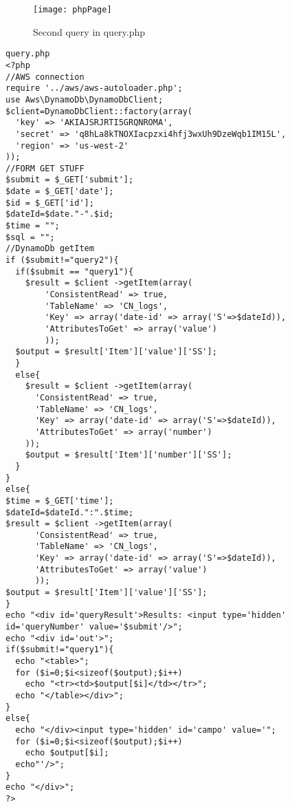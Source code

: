 \documentclass{article}
\begin{document}
\begin{figure}[H]
      \centering
      \texttt{[image: phpPage]}
      \caption{Second query in query.php}
      \label{phpPage}
\end{figure}
\begingroup \fontsize{7pt}{7pt}\selectfont
\label{php_code}
\begin{verbatim}
query.php
<?php
//AWS connection
require '../aws/aws-autoloader.php';
use Aws\DynamoDb\DynamoDbClient;
$client=DynamoDbClient::factory(array(
  'key' => 'AKIAJSRJRTI5GRQNROMA',
  'secret' => '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',
  'region' => 'us-west-2'
));
//FORM GET STUFF
$submit = $_GET['submit'];
$date = $_GET['date'];
$id = $_GET['id'];
$dateId=$date."-".$id;
$time = "";
$sql = "";
//DynamoDb getItem
if ($submit!="query2"){
  if($submit == "query1"){
    $result = $client ->getItem(array(
        'ConsistentRead' => true,
        'TableName' => 'CN_logs',
        'Key' => array('date-id' => array('S'=>$dateId)),
        'AttributesToGet' => array('value')
        ));
  $output = $result['Item']['value']['SS'];
  }
  else{
    $result = $client ->getItem(array(
      'ConsistentRead' => true,
      'TableName' => 'CN_logs',
      'Key' => array('date-id' => array('S'=>$dateId)),
      'AttributesToGet' => array('number')
    ));
    $output = $result['Item']['number']['SS'];
  }
}
else{
$time = $_GET['time'];
$dateId=$dateId.":".$time;
$result = $client ->getItem(array(
      'ConsistentRead' => true,
      'TableName' => 'CN_logs',
      'Key' => array('date-id' => array('S'=>$dateId)),
      'AttributesToGet' => array('value')
      ));
$output = $result['Item']['value']['SS'];
}
echo "<div id='queryResult'>Results: <input type='hidden' id='queryNumber' value='$submit'/>";
echo "<div id='out'>";
if($submit!="query1"){
  echo "<table>";
  for ($i=0;$i<sizeof($output);$i++)
    echo "<tr><td>$output[$i]</td></tr>";
  echo "</table></div>";
}
else{
  echo "</div><input type='hidden' id='campo' value='";
  for ($i=0;$i<sizeof($output);$i++)
    echo $output[$i];
  echo"'/>";
}
echo "</div>";
?>
\end{verbatim}
\endgroup
\end{document}
